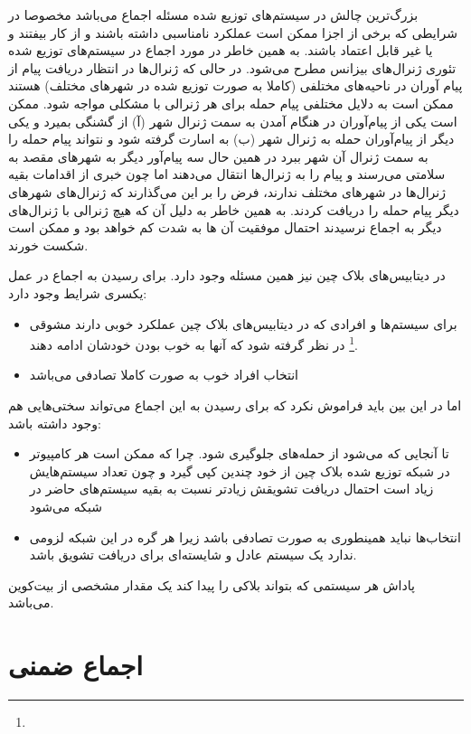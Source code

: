 \documentclass[10pt, a4paper]{article}
\begin{document}
بزرگ‌ترین چالش در سیستم‌های توزیع شده مسئله اجماع می‌باشد مخصوصا در شرایطی که
برخی از اجزا ممکن است عملکرد نامناسبی داشته باشند و از کار بیفتند و یا غیر قابل
اعتماد باشند. به همین خاطر در مورد اجماع در سیستم‌های توزیع شده تئوری ژنرال‌های
بیزانس مطرح می‌شود. در حالی که ژنرال‌ها در انتظار دریافت پیام از پیام آوران در
ناحیه‌های مختلفی (کاملا به صورت توزیع شده در شهر‌های مختلف) هستند ممکن است به
دلایل مختلفی پیام حمله برای هر ژنرالی با مشکلی مواجه شود. ممکن است یکی از
پیام‌آوران در هنگام آمدن به سمت ژنرال شهر (آ) از گشنگی بمیرد و یکی دیگر از
پیام‌آوران حمله به ژنرال شهر (ب) به اسارت گرفته شود و نتواند پیام حمله را به سمت
ژنرال آن شهر ببرد در همین حال سه پیام‌آور دیگر به شهر‌های مقصد به سلامتی می‌رسند
و پیام را به ژنرال‌ها انتقال می‌دهند اما چون خبری از اقدامات بقیه ژنرال‌ها در
شهر‌های مختلف ندارند، فرض را بر این می‌گذارند که ژنرال‌های شهر‌های دیگر پیام
حمله را دریافت کردند. به همین خاطر به دلیل آن که هیچ ژنرالی با ژنرال‌های دیگر به
اجماع نرسیدند احتمال موفقیت آن ها به شدت کم خواهد بود و ممکن است شکست خورند.

در دیتابیس‌های بلاک چین نیز همین مسئله وجود دارد. برای رسیدن به اجماع در عمل
یکسری شرایط وجود دارد:

\begin{itemize}
    \item برای سیستم‌ها و افرادی که در دیتابیس‌های بلاک چین عملکرد خوبی دارند
    مشوقی \footnote{} در نظر گرفته شود که آنها به خوب بودن خودشان
    ادامه دهند.
    \item انتخاب افراد خوب به صورت کاملا تصادفی می‌باشد
\end{itemize}

اما در این بین باید فراموش نکرد که برای رسیدن به این اجماع می‌تواند سختی‌هایی هم
وجود داشته باشد:

\begin{itemize}
    \item تا آنجایی که می‌شود از حمله‌های  جلوگیری شود. چرا که ممکن
    است هر کامپیوتر در شبکه توزیع شده بلاک چین از خود چندین کپی گیرد و چون تعداد
    سیستم‌هایش زیاد است احتمال دریافت تشویقش زیادتر نسبت به بقیه سیستم‌های حاضر
    در شبکه می‌شود
    \item انتخاب‌ها نباید همینطوری به صورت تصادفی باشد زیرا هر گره در این شبکه
    لزومی ندارد یک سیستم عادل و شایسته‌ای برای دریافت تشویق باشد.
\end{itemize}

پاداش هر سیستمی که بتواند بلاکی را پیدا کند یک مقدار مشخصی از بیت‌کوین می‌باشد.

\section{اجماع ضمنی}
\end{document}
